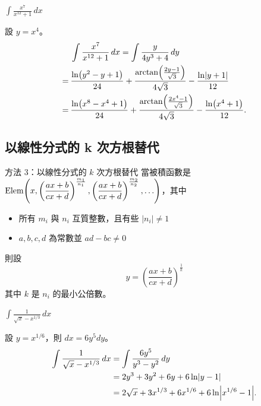 \documentclass{beamer}
\newcommand{\Left} {\mathopen{}\mathclose\bgroup\left}
\newcommand{\Right}{\aftergroup\egroup\right}
\newcommand{\Elem}{\operatorname{Elem}}
\theoremstyle{remark}
\begin{document}
\begin{frame}{$\displaystyle \int \frac{x^7}{x^{12} + 1}\,dx$}
  \begin{solution}
    設 $y = x^4$。
    \begin{align*}
	 & \int \frac{x^7}{x^{12} + 1}\,dx = \int \frac{y}{4y^3 + 4}\,dy\\
      =\:& \frac{\ln \Left( y^2 - y + 1 \Right)}{24} + \frac{\arctan \Left( \frac{2y - 1}{\sqrt3} \Right)}{4\sqrt3}
	  - \frac{\ln \Left| y + 1 \Right|}{12}\\
      =\:& \frac{\ln \Left( x^8 - x^4 + 1 \Right)}{24} + \frac{\arctan \Left( \frac{2x^4 - 1}{\sqrt3} \Right)}{4\sqrt3}
	  - \frac{\ln \Left( x^4 + 1 \Right)}{12}.
    \end{align*}
  \end{solution}
\end{frame}

\subsection[根式替代]{以線性分式的 k 次方根替代}
\begin{frame}{方法 3：以線性分式的 $k$ 次方根替代}
  當被積函數是 $\Elem \Left( x, \left( \dfrac{ax + b}{cx + d} \right)^\frac{m_1}{n_1}, \left( \dfrac{ax + b}{cx + d}
  \right)^\frac{m_2}{n_2}, \dots \Right)$，其中
  \begin{itemize}
    \item 所有 $m_i$ 與 $n_i$ 互質整數，且有些 $|n_i| \ne 1$
    \item $a,b,c,d$ 為常數並 $ad - bc \ne 0$
  \end{itemize}
  則設 
  \[y = \left( \dfrac{ax + b}{cx + d} \right)^\frac1k\]
  其中 $k$ 是 $n_i$ 的最小公倍數。
\end{frame}

\begin{frame}{$\displaystyle \int \frac{1}{\sqrt x - x^{1/3}}\,dx$}
  \begin{solution}
    設 $y = x^{1/6}$，則 $dx = 6y^5 dy$。
    \begin{align*}
      \int \frac{1}{\sqrt x - x^{1/3}}\,dx &= \int \frac{6y^5}{y^3 - y^2}\,dy\\
	&= 2y^3 + 3y^2 + 6y + 6 \ln \Left| y-1 \Right|\\
	&= 2 \sqrt x + 3 x^{1/3} + 6 x^{1/6} + 6 \ln \Left| x^{1/6} - 1 \Right|.
    \end{align*}
  \end{solution}
\end{frame}
\end{document}
